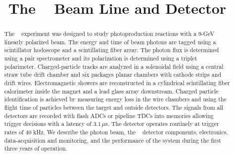 \documentclass{elsarticle}
\begin{document}
  


  
\begin{frontmatter} 


\title{The \gx~ Beam Line and Detector}





\begin{abstract}
The \gx~ experiment was designed to study photoproduction reactions with a 9-GeV linearly polarized beam. The energy and time of beam photons are tagged using a scintillator
hodoscope and a scintillating fiber array. The photon flux is determined using a pair spectrometer and its polarization is determined using a triplet polarimeter. 
Charged-particle tracks are analyzed in a solenoidal field using a central straw tube
drift chamber and six packages planar chambers with cathode strips and drift wires. Electromagnetic showers are reconstructed in a cylindrical scintillating fiber calorimeter inside the magnet and
a lead glass array downstream. Charged particle identification is achieved by measuring energy loss in the wire chambers and using the flight time of particles between the target and outside 
detectors. The signals from all detectors are recorded with flash ADCs or pipeline TDCs into memories allowing trigger decisions with a latency of 3.1\,$\mu$s. The detector operates routinely at
trigger rates of 40 kHz. We describe the photon beam, the \gx~ detector components, electronics, data-acquisition and monitoring, and the performance of the system during the first three 
years of operation.
\end{abstract}   


\end{frontmatter}

  
   

\end{document}
